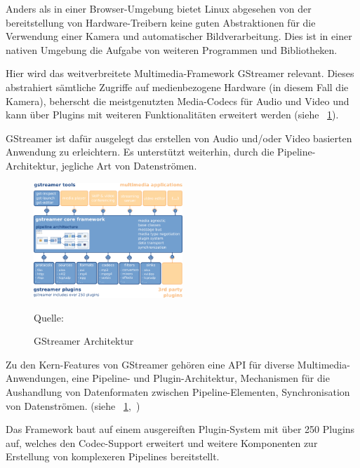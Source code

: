 \documentclass{article}
\newcommand{\figuresource}[1]{
	\begin{center}Quelle: #1\end{center}
}
\begin{document}
\begin{onecolumn}
Anders als in einer Browser-Umgebung bietet Linux abgesehen von der
bereitstellung von Hardware-Treibern keine guten Abstraktionen für die
Verwendung einer Kamera und automatischer Bildverarbeitung. Dies ist in einer
nativen Umgebung die Aufgabe von weiteren Programmen und Bibliotheken.

Hier wird das weitverbreitete Multimedia-Framework GStreamer relevant. Dieses
abstrahiert sämtliche Zugriffe auf medienbezogene Hardware (in diesem Fall die
Kamera), beherscht die meistgenutzten Media-Codecs für Audio und Video und kann
über Plugins mit weiteren Funktionalitäten erweitert werden (siehe
\figurename~\ref{fig:gstreamer-arch}).

GStreamer ist dafür ausgelegt das erstellen von Audio und/oder Video basierten
Anwendung zu erleichtern. Es unterstützt weiterhin, durch die
Pipeline-Architektur, jegliche Art von Datenströmen.


\begin{figure}[ht]
	\includegraphics[width=0.5\textwidth]{gstreamer-overview.png}
	\centering
	\caption[GStreamer Architektur~\cite{GStreamerManualIntro}]{GStreamer Architektur}\label{fig:gstreamer-arch}
	\figuresource{\cite{GStreamerManualIntro}}
\end{figure}

Zu den Kern-Features von GStreamer gehören eine API für diverse
Multimedia-Anwendungen, eine Pipeline- und Plugin-Architektur, Mechanismen für
die Aushandlung von Datenformaten zwischen Pipeline-Elementen, Synchronisation
von Datenströmen. (siehe \figurename~\ref{fig:gstreamer-arch},~\cite{GStreamerManualIntro})

Das Framework baut auf einem ausgereiften Plugin-System mit über 250 Plugins
auf, welches den Codec-Support erweitert und weitere Komponenten zur Erstellung
von komplexeren Pipelines bereitstellt.


\end{onecolumn}
\end{document}
